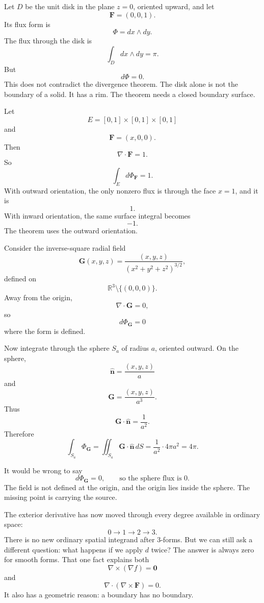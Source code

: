 \begin{example}
Let \(D\) be the unit disk in the plane \(z=0\), oriented upward, and let
\[
    \mathbf F=(0,0,1).
\]
Its flux form is
\[
    \Phi=dx\wedge dy.
\]
The flux through the disk is
\[
    \int_D dx\wedge dy=\pi.
\]
But
\[
    d\Phi=0.
\]
This does not contradict the divergence theorem.  The disk alone is not the boundary
of a solid.  It has a rim.  The theorem needs a closed boundary surface.
\end{example}

\begin{example}
Let
\[
    E=[0,1]\times[0,1]\times[0,1]
\]
and
\[
    \mathbf F=(x,0,0).
\]
Then
\[
    \nabla\cdot\mathbf F=1.
\]
So
\[
    \int_E d\Phi_{\mathbf F}=1.
\]
With outward orientation, the only nonzero flux is through the face \(x=1\), and it is
\[
    1.
\]
With inward orientation, the same surface integral becomes
\[
    -1.
\]
The theorem uses the outward orientation.
\end{example}

\begin{example}
Consider the inverse-square radial field
\[
    \mathbf G(x,y,z)
    =
    \frac{(x,y,z)}{(x^2+y^2+z^2)^{3/2}},
\]
defined on
\[
    \mathbb R^3\setminus\{(0,0,0)\}.
\]
Away from the origin,
\[
    \nabla\cdot\mathbf G=0,
\]
so
\[
    d\Phi_{\mathbf G}=0
\]
where the form is defined.

Now integrate through the sphere \(S_a\) of radius \(a\), oriented outward.  On the
sphere,
\[
    \widehat{\mathbf n}=\frac{(x,y,z)}{a}
\]
and
\[
    \mathbf G=\frac{(x,y,z)}{a^3}.
\]
Thus
\[
    \mathbf G\cdot\widehat{\mathbf n}
    =
    \frac{1}{a^2}.
\]
Therefore
\[
    \int_{S_a}\Phi_{\mathbf G}
    =
    \iint_{S_a}\mathbf G\cdot\widehat{\mathbf n}\,dS
    =
    \frac{1}{a^2}\cdot 4\pi a^2
    =
    4\pi.
\]

It would be wrong to say
\[
    d\Phi_{\mathbf G}=0,
    \qquad
    \text{so the sphere flux is }0.
\]
The field is not defined at the origin, and the origin lies inside the sphere.  The
missing point is carrying the source.
\end{example}

The exterior derivative has now moved through every degree available in ordinary
space:
\[
    0\longrightarrow 1\longrightarrow 2\longrightarrow 3.
\]
There is no new ordinary spatial integrand after \(3\)-forms.  But we can still ask a
different question: what happens if we apply \(d\) twice?  The answer is always zero
for smooth forms.  That one fact explains both
\[
    \nabla\times(\nabla f)=\mathbf 0
\]
and
\[
    \nabla\cdot(\nabla\times\mathbf F)=0.
\]
It also has a geometric reason: a boundary has no boundary.

